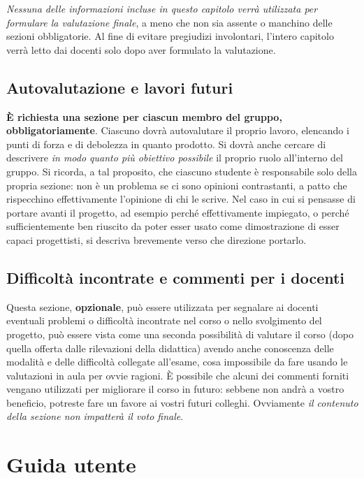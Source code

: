 \documentclass[a4paper,12pt]{report}
\begin{document}
\textit{Nessuna delle informazioni incluse in questo capitolo verrà utilizzata per formulare la valutazione finale}, a meno che non sia assente o manchino delle sezioni obbligatorie.
%
Al fine di evitare pregiudizi involontari, l'intero capitolo verrà letto dai docenti solo dopo aver formulato la valutazione.

\section{Autovalutazione e lavori futuri}

\textbf{È richiesta una sezione per ciascun membro del gruppo, obbligatoriamente}.
%
Ciascuno dovrà autovalutare il proprio lavoro, elencando i punti di forza e di debolezza in quanto prodotto.
Si dovrà anche cercare di descrivere \emph{in modo quanto più obiettivo possibile} il proprio ruolo all'interno del gruppo.
Si ricorda, a tal proposito, che ciascuno studente è responsabile solo della propria sezione: non è un problema se ci sono opinioni contrastanti, a patto che rispecchino effettivamente l'opinione di chi le scrive.
Nel caso in cui si pensasse di portare avanti il progetto, ad esempio perché effettivamente impiegato, o perché sufficientemente ben riuscito da poter esser usato come dimostrazione di esser capaci progettisti, si descriva brevemente verso che direzione portarlo.

\section{Difficoltà incontrate e commenti per i docenti}

Questa sezione, \textbf{opzionale}, può essere utilizzata per segnalare ai docenti eventuali problemi o difficoltà incontrate nel corso o nello svolgimento del progetto, può essere vista come una seconda possibilità di valutare il corso (dopo quella offerta dalle rilevazioni della didattica) avendo anche conoscenza delle modalità e delle difficoltà collegate all'esame, cosa impossibile da fare usando le valutazioni in aula per ovvie ragioni.
%
È possibile che alcuni dei commenti forniti vengano utilizzati per migliorare il corso in futuro: sebbene non andrà a vostro beneficio, potreste fare un favore ai vostri futuri colleghi.
%
Ovviamente \textit{il contenuto della sezione non impatterà il voto finale}.

\appendix
\chapter{Guida utente}
\end{document}
